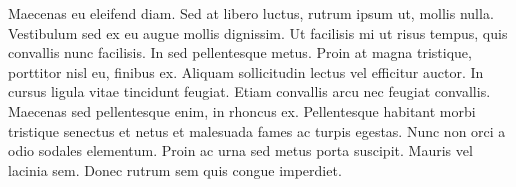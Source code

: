 \documentclass[%
 reprint,
 amsmath,amssymb,
 aps,
]{revtex4-2}
\begin{document}
Maecenas eu eleifend diam. Sed at libero luctus, rutrum ipsum ut, mollis nulla. Vestibulum sed ex eu augue mollis dignissim. Ut facilisis mi ut risus tempus, quis convallis nunc facilisis. In sed pellentesque metus. Proin at magna tristique, porttitor nisl eu, finibus ex. Aliquam sollicitudin lectus vel efficitur auctor. In cursus ligula vitae tincidunt feugiat. Etiam convallis arcu nec feugiat convallis. Maecenas sed pellentesque enim, in rhoncus ex. Pellentesque habitant morbi tristique senectus et netus et malesuada fames ac turpis egestas. Nunc non orci a odio sodales elementum. Proin ac urna sed metus porta suscipit. Mauris vel lacinia sem. Donec rutrum sem quis congue imperdiet. 
\nocite{*}

\end{document}
